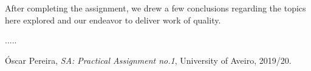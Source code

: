 \documentclass[12pt]{article}
\begin{document}
After completing the assignment, we drew a few conclusions regarding the topics here explored and our endeavor to deliver work of quality.

.....

\begin{thebibliography}{9} %
  

    Óscar Pereira,
    \textit{SA: Practical Assignment no.1},
    University of Aveiro,
    2019/20.
  

  
\end{thebibliography}

\clearpage
\end{document}
